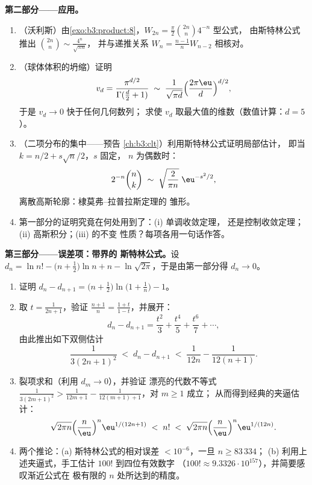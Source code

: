 \begin{problem}
\medskip
\noindent\textbf{第二部分——应用。}
\begin{enumerate}[resume]
  \item （沃利斯）由\cref{exo:b3:product:8}，$W_{2n} =
        \frac\pi2\binom{2n}n4^{-n}$ 型公式，
        由斯特林公式推出 $\binom{2n}{n} \sim \frac{4^n}{\sqrt{\pi n}}$，
        并与递推关系 $W_{n} =
        \frac{n-1}nW_{n-2}$ 相核对。
  \item （球体体积的坍缩）证明
        \[
        v_d = \frac{\pi^{d/2}}{\Gamma(\frac d2 + 1)}
        \;\sim\; \frac{1}{\sqrt{\pi d}}
        \Bigl(\frac{2\pi\eu}{d}\Bigr)^{d/2},
        \]
        于是 $v_d \to 0$ 快于任何几何数列；
        求使 $v_d$ 取最大值的维数（数值计算：$d =
        5$）。
  \item （二项分布的集中——预告
        \cref{ch:b3:clt}）利用斯特林公式证明局部估计，
        即当 $k = n/2 + s\sqrt n/2$，$s$ 固定，
        $n$ 为偶数时：
        \[
        2^{-n}\binom{n}{k} \;\sim\;
        \sqrt{\frac{2}{\pi n}}\;\eu^{-s^2/2},
        \]
        离散高斯轮廓：棣莫弗--拉普拉斯定理的
        雏形。
  \item 第一部分的证明究竟在何处用到了：(i) 单调收敛定理，
        还是控制收敛定理；(ii) 高斯积分；(iii) 的不变
        性质？每项各用一句话作答。
\end{enumerate}

\medskip
\noindent\textbf{第三部分——误差项：带界的
斯特林公式。}设 $d_n = \ln n! - \bigl(n + \tfrac12\bigr)\ln n + n -
\ln\sqrt{2\pi}$，于是由第一部分得 $d_n \to 0$。
\begin{enumerate}[resume]
  \item 证明 $d_n - d_{n+1} = \bigl(n +
        \tfrac12\bigr)\ln\bigl(1 + \tfrac1n\bigr) - 1$。
  \item 取 $t = \frac1{2n+1}$，验证 $\frac{n+1}n =
        \frac{1+t}{1-t}$，并展开：
        \[
        d_n - d_{n+1} = \frac{t^2}3 + \frac{t^4}5 +
        \frac{t^6}7 + \cdots,
        \]
        由此推出如下双侧估计
        \[
        \frac1{3(2n+1)^2} \;<\; d_n - d_{n+1} \;<\;
        \frac1{12n} - \frac1{12(n+1)} .
        \]
  \item 裂项求和（利用 $d_m \to 0$），并验证
        漂亮的代数不等式 $\frac1{3(2m+1)^2} >
        \frac1{12m+1} - \frac1{12(m+1)+1}$，对 $m \geq 1$ 成立；
        从而得到经典的夹逼估计：
        \[
        \sqrt{2\pi n}\Bigl(\frac n\eu\Bigr)^n
        \eu^{1/(12n+1)} \;<\; n! \;<\;
        \sqrt{2\pi n}\Bigl(\frac n\eu\Bigr)^n\eu^{1/(12n)} .
        \]
  \item 两个推论：(a) 斯特林公式的相对误差
        $< 10^{-6}$，一旦 $n \geq 83\,334$；
        (b) 利用上述夹逼式，手工估计 $100!$ 到四位有效数字
        （$100! \approx 9.3326\cdot
        10^{157}$），并简要感叹渐近公式在
        极有限的 $n$ 处所达到的精度。
\end{enumerate}


\end{problem}
